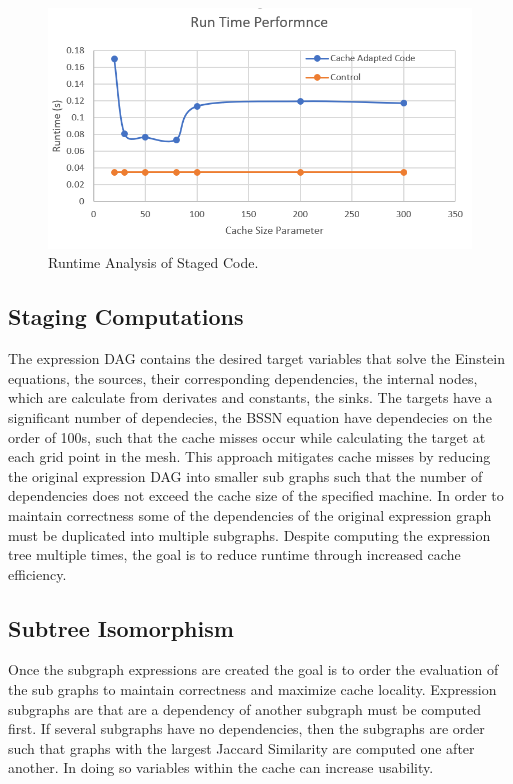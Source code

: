 \documentclass[10pt, conference]{IEEEtran} %
\begin{document}
  \begin{figure}
    \includegraphics[width=\linewidth]{../runtime_plot.png}
  	\caption{Runtime Analysis of Staged Code.}
  	\label{fig:runtime_results}
\end{figure}

\subsection{Staging Computations}
The expression DAG contains the desired target variables that solve the Einstein equations, the sources, their corresponding dependencies, the internal nodes, which are calculate from derivates and constants, the sinks. The targets have a significant number of dependecies, the BSSN equation have dependecies on the order of 100s, such that the cache misses occur while calculating the target at each grid point in the mesh. This approach mitigates cache misses by reducing the original expression DAG into smaller sub graphs such that the number of dependencies does not exceed the cache size of the specified machine. In order to maintain correctness some of the dependencies of the original expression graph must be duplicated into multiple subgraphs. Despite computing the expression tree multiple times, the goal is to reduce runtime through increased cache efficiency.

\subsection{Subtree Isomorphism}
Once the subgraph expressions are created the goal is to order the evaluation of the sub graphs to maintain correctness and maximize cache locality. Expression subgraphs are that are a dependency of another subgraph must be computed first. If several subgraphs have no dependencies, then the subgraphs are order such that graphs with the largest Jaccard Similarity are computed one after another. In doing so variables within the cache can increase usability.  
\end{document}
